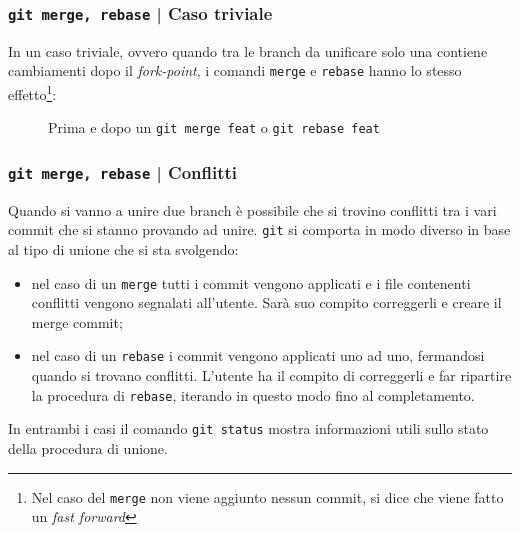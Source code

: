 \documentclass{beamer}
\begin{document}
\begin{frame}
  \label{trivial}
  \frametitle{\texttt{git merge, rebase} | Caso triviale}
  In un caso triviale, ovvero quando tra le branch da unificare solo una contiene
  cambiamenti dopo il \emph{fork-point}, i comandi \texttt{merge} e \texttt{rebase}
  hanno lo stesso effetto\footnote{Nel caso del \texttt{merge} non viene
  aggiunto nessun commit, si dice che viene fatto un \emph{fast forward}}:
  \begin{figure}
    \centering
    \quad
    \caption{Prima e dopo un \texttt{git merge feat} o \texttt{git rebase feat}}
  \end{figure}
\end{frame}

\begin{frame}
  \label{conflict}
  \frametitle{\texttt{git merge, rebase} | Conflitti}
  Quando si vanno a unire due branch \`e possibile che si trovino conflitti tra
  i vari commit che si stanno provando ad unire. \texttt{git} si comporta in modo diverso
  in base al tipo di unione che si sta svolgendo:
  \begin{itemize}
    \item<1-> nel caso di un \texttt{merge} tutti i commit vengono applicati e 
      i file contenenti conflitti vengono segnalati all'utente. Sar\`a suo
      compito correggerli e creare il merge commit;
    \item<2-> nel caso di un \texttt{rebase} i commit vengono applicati uno ad
      uno, fermandosi quando si trovano conflitti. L'utente ha il compito di
      correggerli e far ripartire la procedura di \texttt{rebase}, iterando
      in questo modo fino al completamento.
  \end{itemize}
  In entrambi i casi il comando \texttt{git status} mostra informazioni utili
  sullo stato della procedura di unione.
\end{frame}
\end{document}
